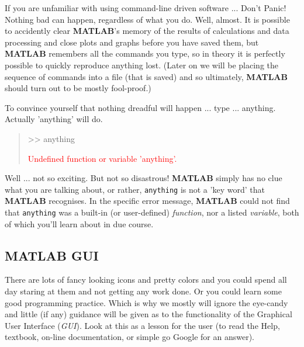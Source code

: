\documentclass{tufte-book} %
\newenvironment{docspec}{\begin{quotation}\ttfamily\parskip0pt\parindent0pt\ignorespaces}{\end{quotation}}
\begin{document}
If you are unfamiliar with using command-line driven software ... Don't Panic!\cite{Adams1979} Nothing bad can happen, regardless of what you do. Well, almost. It is possible to accidently clear \textbf{MATLAB}'s memory of the results of calculations and data processing and close plots and graphs before you have saved them, but \textbf{MATLAB} remembers all the commands you type, so in theory it is perfectly possible to quickly reproduce anything lost. (Later on we will be placing the sequence of commands into a file (that is saved) and so ultimately, \textbf{MATLAB} should turn out to be mostly fool-proof.)

To convince yourself that nothing dreadful will happen ... type ... anything. Actually 'anything' will do.

\begin{docspec}
>> anything

\textcolor{red}{Undefined function or variable 'anything'.}
\end{docspec}

Well ... not so exciting. But not so disastrous! \textbf{MATLAB} simply has no clue what you are talking about, or rather, \texttt{anything} is not a 'key word' that \textbf{MATLAB} recognises. In the specific error message, \textbf{MATLAB} could not find that \texttt{anything} was a built-in (or user-defined) \textit{function}, nor a listed \textit{variable}, both of which you'll learn about in due course.


\subsection{MATLAB GUI}

There are lots of fancy looking icons and pretty colors and you could spend all day staring at them and not getting any work done. Or you could learn some good programming practice. Which is why we mostly will ignore the eye-candy and little (if any) guidance will be given as to the functionality of the Graphical User Interface (\textit{GUI}). Look at this as a lesson for the user (to read the \textsf{Help}, textbook, on-line documentation, or simple go Google for an answer).
\end{document}
